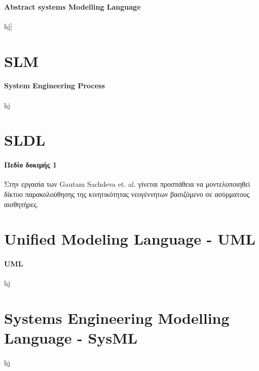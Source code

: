 \documentclass[a4paper,12pt,twoside]{report}
\begin{document}
			\paragraph{Abstract systems Modelling Language}{hj]
		\section{SLM}
			\paragraph{System Engineering Process}{hj}
		\section{SLDL}
			\paragraph{Πεδίο δοκιμής 1} { Στην εργασία των Gautam Sachdeva et. al. \cite{SMWirelessSensorNetwork} γίνεται προσπάθεια να μοντελοποιηθεί δίκτυο παρακολούθησης της κινητικότητας νεογέννητων βασιζόμενο σε ασύρματους αισθητήρες. 
			}
		\section{Unified Modeling Language - UML}
			\paragraph{\gls{UML}} {hj}
		\section{Systems Engineering Modelling Language - SysML}
			\paragraph{}{hj}

}
\end{document}
